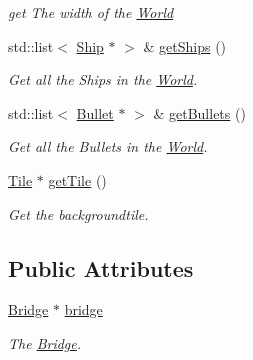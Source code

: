 \begin{DoxyCompactItemize}
\begin{DoxyCompactList}\small\item\em get The width of the \hyperlink{classty_lib_1_1_world}{World} \end{DoxyCompactList}\item 
\hypertarget{classty_lib_1_1_world_aa7b308467c7a3b4b2f9469b7aeeb9160}{}std\+::list$<$ \hyperlink{classty_lib_1_1_ship}{Ship} $\ast$ $>$ \& \hyperlink{classty_lib_1_1_world_aa7b308467c7a3b4b2f9469b7aeeb9160}{get\+Ships} ()\label{classty_lib_1_1_world_aa7b308467c7a3b4b2f9469b7aeeb9160}

\begin{DoxyCompactList}\small\item\em Get all the Ships in the \hyperlink{classty_lib_1_1_world}{World}. \end{DoxyCompactList}\item 
\hypertarget{classty_lib_1_1_world_a8e71ce8d440a67a6dd4a67dff361d78b}{}std\+::list$<$ \hyperlink{classty_lib_1_1_bullet}{Bullet} $\ast$ $>$ \& \hyperlink{classty_lib_1_1_world_a8e71ce8d440a67a6dd4a67dff361d78b}{get\+Bullets} ()\label{classty_lib_1_1_world_a8e71ce8d440a67a6dd4a67dff361d78b}

\begin{DoxyCompactList}\small\item\em Get all the Bullets in the \hyperlink{classty_lib_1_1_world}{World}. \end{DoxyCompactList}\item 
\hypertarget{classty_lib_1_1_world_a158ca5e7b7d4a8ed9a000e00598f31be}{}\hyperlink{classty_lib_1_1_tile}{Tile} $\ast$ \hyperlink{classty_lib_1_1_world_a158ca5e7b7d4a8ed9a000e00598f31be}{get\+Tile} ()\label{classty_lib_1_1_world_a158ca5e7b7d4a8ed9a000e00598f31be}

\begin{DoxyCompactList}\small\item\em Get the backgroundtile. \end{DoxyCompactList}\end{DoxyCompactItemize}
\subsection*{Public Attributes}
\begin{DoxyCompactItemize}
\item 
\hypertarget{classty_lib_1_1_world_a7046a485b63a96e8728766e53dfe9d58}{}\hyperlink{classty_lib_1_1_bridge}{Bridge} $\ast$ \hyperlink{classty_lib_1_1_world_a7046a485b63a96e8728766e53dfe9d58}{bridge}\label{classty_lib_1_1_world_a7046a485b63a96e8728766e53dfe9d58}

\begin{DoxyCompactList}\small\item\em The \hyperlink{classty_lib_1_1_bridge}{Bridge}. \end{DoxyCompactList}\end{DoxyCompactItemize}
